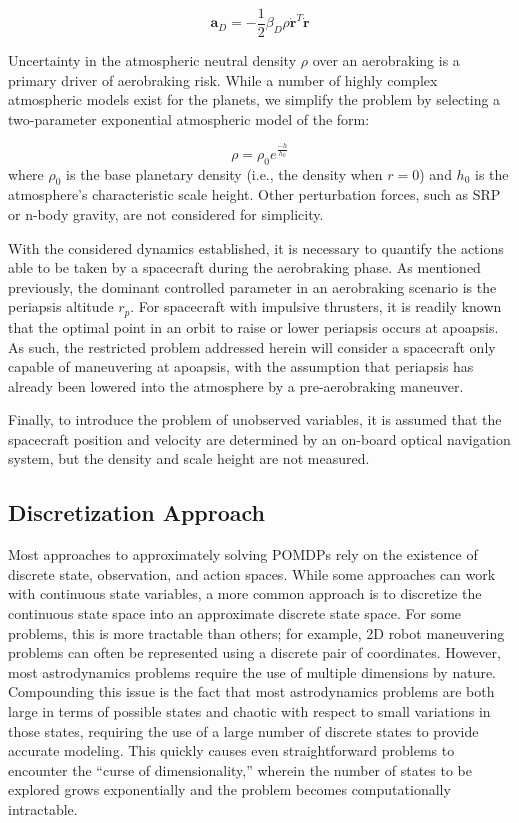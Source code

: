 \documentclass[paper,11pt]{AAS}		%
\begin{document}
\begin{equation}
\bm{a}_D = -\frac{1}{2} \beta_D \rho \bm{\dot{r}}^T\bm{\dot{r}}
\label{eqn:dragEqn}
\end{equation}

Uncertainty in the atmospheric neutral density $\rho$ over an aerobraking is a 
primary driver of aerobraking risk. While a number of highly complex atmospheric models exist for the planets, we simplify the 
problem by selecting a two-parameter exponential atmospheric model of the form:

\begin{equation}
\rho = \rho_0 e^{\frac{-h}{h_0}}
\label{eqn:expAtmo}
\end{equation}
where $\rho_0$ is the base planetary density (i.e., the density when $r=0$) and $h_0$ is the atmosphere's characteristic scale height. Other perturbation forces, such as SRP or n-body gravity, are not considered for simplicity.

With the considered dynamics established, it is necessary to quantify the actions able to be taken by a spacecraft during the aerobraking phase. As mentioned previously, the dominant controlled parameter in an aerobraking scenario is the periapsis altitude $r_p$. For spacecraft with impulsive thrusters, it is readily known that the optimal point in an orbit to raise or lower periapsis occurs at apoapsis. As such, the restricted problem addressed herein will consider a spacecraft only capable of maneuvering at apoapsis, with the assumption that periapsis has already been lowered into the atmosphere by a pre-aerobraking maneuver.

Finally, to introduce the problem of unobserved variables, it is assumed that the spacecraft position and velocity are determined by an on-board optical navigation system, but the density and scale height are not measured. 

\subsection{Discretization Approach}
\label{sec:discretization}
Most approaches to approximately solving POMDPs rely on the existence of discrete state, observation, and action spaces. While some approaches can work with continuous state variables, a more common approach is to discretize the continuous state space into an approximate discrete state space. For some problems, this is more tractable than others; for example, 2D robot maneuvering problems can often be represented using a discrete pair of coordinates. However, most astrodynamics problems require the use of multiple dimensions by nature. Compounding this issue is the fact that most astrodynamics problems are both large in terms of possible states and chaotic with respect to small variations in those states, requiring the use of a large number of discrete states to provide accurate modeling. This quickly causes even straightforward problems to encounter the ``curse of dimensionality,'' wherein the number of states to be explored grows exponentially and the problem becomes computationally intractable. 
\end{document}

